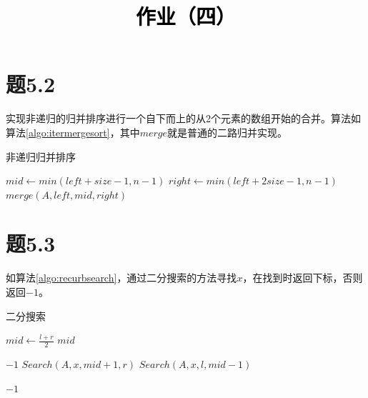 \documentclass[a4paper,twoside]{article}
\newcommand{\PaperTitle}{作业（四）}  %
\begin{document}
\newpage

\title{
	\Large{\textcolor{black}{\PaperTitle}}
}
	
	
\maketitle
	
\tableofcontents
 
\newpage
\setcounter{page}{1}

\begin{spacing}{1.2}

\section{题5.2}

实现非递归的归并排序进行一个自下而上的从2个元素的数组开始的合并。算法如算法\ref{algo:itermergesort}，其中$merge$就是普通的二路归并实现。

\begin{algorithm}
	\caption{非递归归并排序}
	\label{algo:itermergesort}
	\begin{algorithmic}[1]
		\State $mid \gets min(left+size-1,n-1)$
		\State $right \gets min(left+2size-1,n-1)$
		\State $merge(A,left,mid,right)$
		\EndFor
		\EndFor
		\EndProcedure
		
	\end{algorithmic}
\end{algorithm}	

\section{题5.3}
如算法\ref{algo:recurbsearch}，通过二分搜索的方法寻找$x$，在找到时返回下标，否则返回$-1$。

\begin{algorithm}
	\caption{二分搜索}
	\label{algo:recurbsearch}
	\begin{algorithmic}[1]
		\State $mid \gets \frac{l+r}{2} $
		\Return $mid$
		\EndIf
		
		\Return $-1$
		\Return $Search(A,x,mid+1,r)$
		\Return $Search(A,x,l,mid-1)$
		\EndIf
		
		\Return $-1$
		\EndProcedure
	\end{algorithmic}
\end{algorithm}	


\end{spacing}
\end{document}
